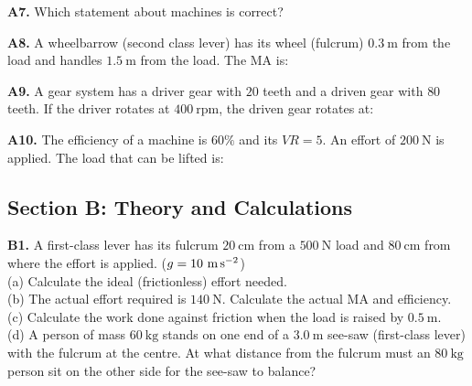 \begin{exercisebox}[10]

\vspace{0.4cm}

\textbf{A7.} Which statement about machines is
correct?


\vspace{0.4cm}

\textbf{A8.} A wheelbarrow (second class lever) has
its wheel (fulcrum) $0.3\ \text{m}$ from the load
and handles $1.5\ \text{m}$ from the load. The MA is:


\vspace{0.4cm}

\textbf{A9.} A gear system has a driver gear with
$20$ teeth and a driven gear with $80$ teeth.
If the driver rotates at $400\ \text{rpm}$, the
driven gear rotates at:


\vspace{0.4cm}

\textbf{A10.} The efficiency of a machine is $60\%$
and its $VR = 5$. An effort of $200\ \text{N}$ is
applied. The load that can be lifted is:


\vspace{0.6cm}

\subsection*{Section B: Theory and Calculations}

\textbf{B1.} A first-class lever has its fulcrum
$20\ \text{cm}$ from a $500\ \text{N}$ load and
$80\ \text{cm}$ from where the effort is applied.
($g = 10\ \text{m\,s}^{-2}$)\\[4pt]
(a) Calculate the ideal (frictionless) effort needed.\\
(b) The actual effort required is $140\ \text{N}$.
Calculate the actual MA and efficiency.\\
(c) Calculate the work done against friction when the
load is raised by $0.5\ \text{m}$.\\
(d) A person of mass $60\ \text{kg}$ stands on one
end of a $3.0\ \text{m}$ see-saw (first-class lever)
with the fulcrum at the centre. At what distance from
the fulcrum must an $80\ \text{kg}$ person sit on the
other side for the see-saw to balance?
\hfill{}


\end{exercisebox}
